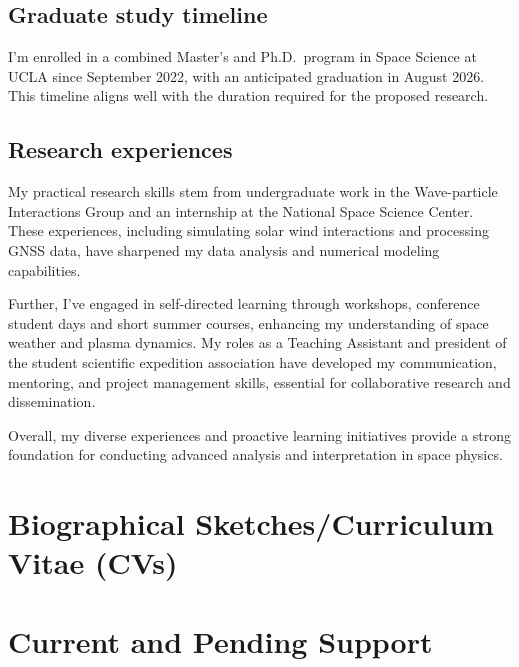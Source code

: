 \documentclass[
  letterpaper,
  DIV=11,
  numbers=noendperiod]{scrartcl}
\begin{document}
\subsection{Graduate study timeline}\label{graduate-study-timeline}

I'm enrolled in a combined Master's and Ph.D.~program in Space Science
at UCLA since September 2022, with an anticipated graduation in August
2026. This timeline aligns well with the duration required for the
proposed research.

\subsection{Research experiences}\label{research-experiences}

My practical research skills stem from undergraduate work in the
Wave-particle Interactions Group and an internship at the National Space
Science Center. These experiences, including simulating solar wind
interactions and processing GNSS data, have sharpened my data analysis
and numerical modeling capabilities.

Further, I've engaged in self-directed learning through workshops,
conference student days and short summer courses, enhancing my
understanding of space weather and plasma dynamics. My roles as a
Teaching Assistant and president of the student scientific expedition
association have developed my communication, mentoring, and project
management skills, essential for collaborative research and
dissemination.

Overall, my diverse experiences and proactive learning initiatives
provide a strong foundation for conducting advanced analysis and
interpretation in space physics.

\section{Biographical Sketches/Curriculum Vitae
(CVs)}\label{biographical-sketchescurriculum-vitae-cvs}

\section{Current and Pending Support}\label{current-and-pending-support}
\end{document}
